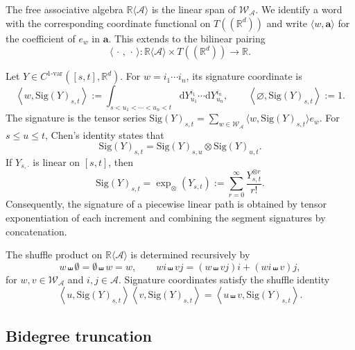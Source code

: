 \documentclass{amsart}
\theoremstyle{definition}
\theoremstyle{remark}
\newcommand{\dd}{\mathrm{d}}
\newcommand{\Sig}[1]{\mathrm{Sig}(#1)}
\begin{document}
The free associative algebra
$\mathbb{R}\langle\mathcal{A}\rangle$ is the linear span of
$\mathcal{W}_{\mathcal{A}}$.
We identify a word with the corresponding coordinate functional on
$T((\mathbb{R}^{d}))$ and write $\langle w,\mathbf{a}\rangle$ for the
coefficient of $e_w$ in $\mathbf{a}$. This extends to the bilinear pairing
\[
    \langle \,\cdot\,,\,\cdot\,\rangle
    \colon
    \mathbb{R}\langle\mathcal{A}\rangle
    \times
    T((\mathbb{R}^{d}))
    \longrightarrow
    \mathbb{R}.
\]

Let $Y\in C^{1\text{-var}}([s,t],\mathbb{R}^{d})$. For
$w=i_1\cdots i_n$, its signature coordinate is
\[
    \left\langle
        w,
        \Sig{Y}_{s,t}
    \right\rangle
    :=
    \int_{s<u_1<\cdots<u_n<t}
    \dd Y^{i_1}_{u_1}\cdots\dd Y^{i_n}_{u_n},
    \qquad
    \left\langle
        \varnothing,
        \Sig{Y}_{s,t}
    \right\rangle
    :=
    1.
\]
The signature is the tensor series
$\Sig{Y}_{s,t}
=
\sum_{w\in\mathcal{W}_{\mathcal{A}}}
\langle w,\Sig{Y}_{s,t}\rangle e_w$.
For $s\leq u\leq t$, Chen's identity states that
\[
    \Sig{Y}_{s,t}
    =
    \Sig{Y}_{s,u}
    \otimes
    \Sig{Y}_{u,t}.
\]
If $Y_{s,\cdot}$ is linear on $[s,t]$, then
\[
    \Sig{Y}_{s,t}
    =
    \exp_{\otimes}(Y_{s,t})
    :=
    \sum_{r=0}^{\infty}
    \frac{Y_{s,t}^{\otimes r}}{r!}.
\]
Consequently, the signature of a piecewise linear path is obtained by tensor exponentiation of each increment and combining the
segment signatures by concatenation.

The shuffle product on
$\mathbb{R}\langle\mathcal{A}\rangle$ is determined recursively by
\[
    w\shuffle\emptyset
    =
    \emptyset\shuffle w
    =
    w,
    \qquad
    wi\shuffle vj
    =
    (w\shuffle vj)i
    +
    (wi\shuffle v)j,
\]
for $w,v\in\mathcal{W}_{\mathcal{A}}$ and $i,j\in\mathcal{A}$. Signature
coordinates satisfy the shuffle identity
\[
    \left\langle
        u,
        \Sig{Y}_{s,t}
    \right\rangle
    \left\langle
        v,
        \Sig{Y}_{s,t}
    \right\rangle
    =
    \left\langle
        u\shuffle v,
        \Sig{Y}_{s,t}
    \right\rangle.
\]

\subsection{Bidegree truncation}\label{sec:bigraded_truncation}
\end{document}
